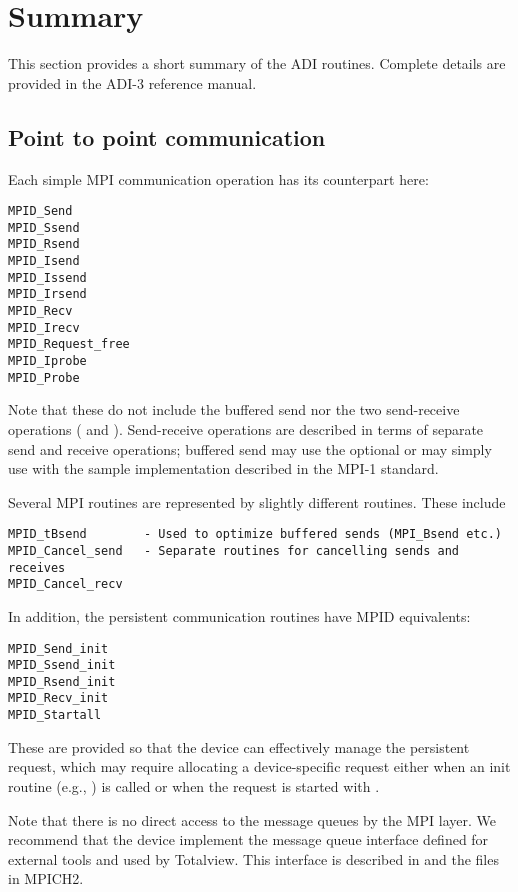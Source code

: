 
\section{Summary}
\label{sec:adi-summary}
This section provides a short summary of the ADI routines.  Complete details
are provided in the ADI-3 reference manual.

\subsection{Point to point communication}
Each simple MPI communication operation has its counterpart here:
\begin{verbatim}
MPID_Send
MPID_Ssend
MPID_Rsend
MPID_Isend
MPID_Issend
MPID_Irsend
MPID_Recv
MPID_Irecv
MPID_Request_free
MPID_Iprobe
MPID_Probe
\end{verbatim}
Note that these do not include the buffered send nor the two send-receive
operations ( and ).
Send-receive operations are described in terms of separate send and receive
operations; buffered send may use the optional  or may
simply use  with the sample implementation described in the
MPI-1 standard.

Several MPI routines are represented by slightly different routines.
These include 
\begin{verbatim}
MPID_tBsend        - Used to optimize buffered sends (MPI_Bsend etc.)
MPID_Cancel_send   - Separate routines for cancelling sends and receives
MPID_Cancel_recv
\end{verbatim}

In addition, the persistent communication routines have MPID equivalents:
\begin{verbatim}
MPID_Send_init
MPID_Ssend_init
MPID_Rsend_init
MPID_Recv_init
MPID_Startall
\end{verbatim}
These are provided so that the device can effectively manage the
persistent request, which may require allocating a device-specific
request either when an init routine (e.g., ) is
called or when the request is started with .  

Note that there is no direct access to the message queues by the MPI
layer.  We recommend that the device implement the message queue
interface defined for external tools and used by Totalview.  This
interface is described in \cite{pvmmpi99-totalview} and the files
 in MPICH2.

